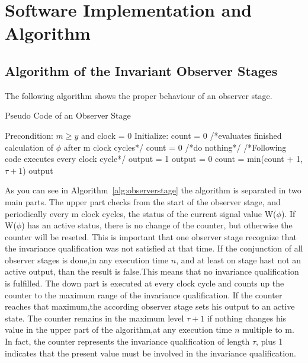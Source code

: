 
\chapter{Software Implementation and Algorithm}



\section{Algorithm of the Invariant Observer Stages}

The following algorithm shows the proper behaviour of an observer stage.\newline

\begin{algorithm}
\caption{Pseudo Code of an Observer Stage}
\label{alg:observerstage}
\begin{algorithmic}[1]
\REQUIRE Precondition: $m \ge y$ and clock = 0
\STATE Initialize: count = 0
 \STATE  /*evaluates finished calculation of $\phi$ after m clock cycles*/
 \STATE  count = 0 
 \ELSE
  \STATE /*do nothing*/ 
 \ENDIF
\ENDIF 
\STATE /*Following code executes every clock cycle*/
 \STATE output = 1
\ELSE
 \STATE output = 0
\ENDIF
\STATE count = min(count + 1,$\tau + 1$)
\RETURN output
\end{algorithmic}
\end{algorithm}

As you can see in Algorithm~\ref{alg:observerstage} the algorithm is separated in two main parts. 
The upper part checks from the start of the observer stage, and periodically every m clock cycles,
the status of the current signal value W($\phi$). If W($\phi$) has an active status, there is no change of
the counter, but otherwise the counter will be reseted.
This is important that one observer stage recognize that the invariance qualification was not satisfied
at that time. If the conjunction of all observer stages is done,in any execution time $n$, and at least on stage hast not an active output,
than the result is false.This means that no invariance qualification is fulfilled.
The down part is executed at every clock cycle and counts up the counter to the maximum range of the invariance qualification.
If the counter reaches that maximum,the according observer stage sets his output to an active state. The counter remains in the maximum level $\tau+1$ if
nothing changes his value in the upper part of the algorithm,at any execution time $n$ multiple to m. In fact, the counter represents the invariance qualification of length
$\tau$, plus 1 indicates that the present value must be involved in the invariance qualification.

